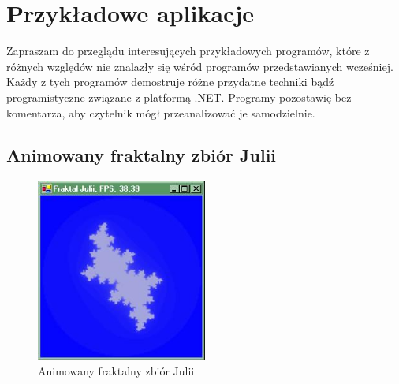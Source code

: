 ﻿\appendix 

\chapter{Przykładowe aplikacje}

Zapraszam do przeglądu interesujących przykładowych programów, które z różnych względów nie znalazły się
wśród programów przedstawianych wcześniej. Każdy z tych programów demostruje różne przydatne techniki
bądź programistyczne związane z platformą .NET. Programy pozostawię bez komentarza, aby
czytelnik mógł przeanalizować je samodzielnie.

\section{Animowany fraktalny zbiór Julii}

\begin{figure}
\begin{center}
\includegraphics[width=0.50\textwidth]{./pic/app01}
\caption{Animowany fraktalny zbiór Julii}
\end{center}
\end{figure}

